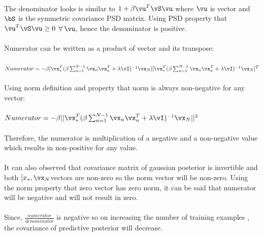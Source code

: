 \documentclass[a4paper,11pt]{article}
\begin{document}
\begin{pmisolution}
\\
The denominator looks is similar to \( 1+ \beta\vu^{T}\vS\vu\) where \(\vu\) is vector and \(\bS\) is the symmetric covariance PSD matrix. Using PSD property that \(\vu^{T}\vS\vu \geq 0\) \(\forall \: \vu\), hence the denominator is positive.\\
\\
Numerator can be written as a product of vector and its transpose:\\
\\
\(Numerator = -\beta [\vx_{\ast}^{T}(\beta\sum_{n=1}^{N-1}\vx_{n}\vx_{n}^{T} + \lambda\vI)^{-1}\vx_{N}][\vx_{\ast}^{T}(\beta\sum_{n=1}^{N-1}\vx_{n}\vx_{n}^{T} + \lambda\vI)^{-1}\vx_{N}]^{T}\)\\
\\
Using norm definition and property that norm is always non-negative for any vector:\\
\\
\(Numerator = -\beta ||\vx_{\ast}^{T}(\beta\sum_{n=1}^{N-1}\vx_{n}\vx_{n}^{T} + \lambda\vI)^{-1}\vx_{N}||^{2}\)\\
\\
Therefore, the numerator is multiplication of a negative and a non-negative value which results in non-positive for any value. \\
\\
It can also observed that covariance matrix of gaussian posterior is invertible and both \([x_{\ast},\vx_{N}\)vectors are non-zero so the norm vector will be non-zero. Using the norm property that zero vector has zero norm, it can be said that numerator will be negative and will not result in zero.
\\
\\
Since, \(\frac{numerator}{denominator}\) is negative so on increasing the number of training examples , the covariance of predictive posterior will decrease.

\end{pmisolution}
\end{document}
